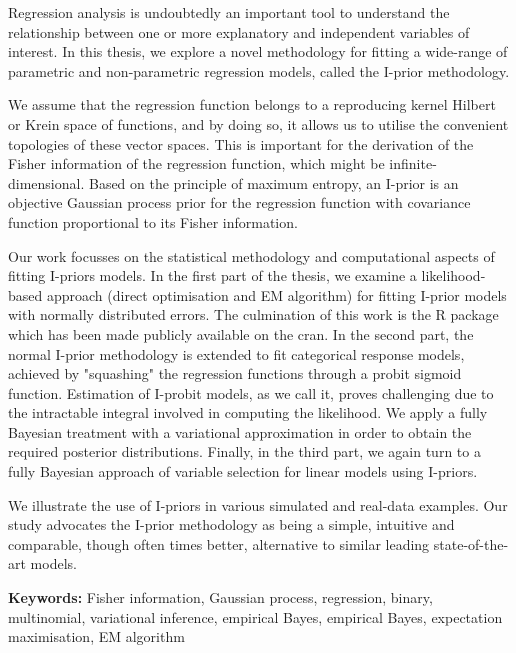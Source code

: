 Regression analysis is undoubtedly an important tool to understand the relationship between one or more explanatory and independent variables of interest. 
In this thesis, we explore a novel methodology for fitting a wide-range of parametric and non-parametric regression models, called the I-prior methodology. 

We assume that the regression function belongs to a reproducing kernel Hilbert or Krein space of functions, and by doing so, it allows us to utilise the convenient topologies of these vector spaces. 
This is important for the derivation of the Fisher information of the regression function, which might be infinite-dimensional. Based on the principle of maximum entropy, an I-prior is an objective Gaussian process prior for the regression function with covariance function proportional to its Fisher information. 

Our work focusses on the statistical methodology and computational aspects of fitting I-priors models. In the first part of the thesis, we examine a likelihood-based approach (direct optimisation and EM algorithm) for fitting I-prior models with normally distributed errors.
The culmination of this work is the R package  which has been made publicly available on the \gls*{cran}. In the second part, the normal I-prior methodology is extended to fit categorical response models, achieved by "squashing" the regression functions through a probit sigmoid function.
 Estimation of I-probit models, as we call it, proves challenging due to the intractable integral involved in computing the likelihood. 
 We apply a fully Bayesian treatment with a variational approximation in order to obtain the required posterior distributions. 
 Finally, in the third part, we again turn to a fully Bayesian approach of variable selection for linear models using I-priors.

We illustrate the use of I-priors in various simulated and real-data examples. 
Our study advocates the I-prior methodology as being a simple, intuitive and comparable, though often times better, alternative to similar leading state-of-the-art models. 


\vspace{1em}
{\noindent\textbf{Keywords:} 
	Fisher information, Gaussian process, regression, binary, multinomial, variational inference, empirical Bayes, empirical Bayes, expectation maximisation, EM algorithm
}